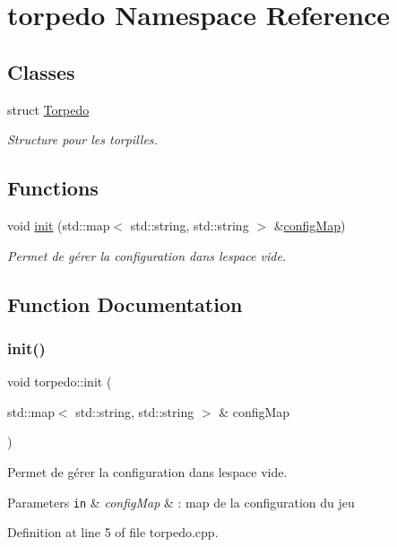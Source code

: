 \hypertarget{namespacetorpedo}{}\section{torpedo Namespace Reference}
\label{namespacetorpedo}
\subsection*{Classes}
\begin{DoxyCompactItemize}
\item 
struct \hyperlink{structtorpedo_1_1_torpedo}{Torpedo}
\begin{DoxyCompactList}\small\item\em Structure pour les torpilles. \end{DoxyCompactList}\end{DoxyCompactItemize}
\subsection*{Functions}
\begin{DoxyCompactItemize}
\item 
void \hyperlink{namespacetorpedo_ad2f33d6b4c7571ef3013ab1b7db70a8b}{init} (std\+::map$<$ std\+::string, std\+::string $>$ \&\hyperlink{main_8cpp_ada2160bcc2082e595d02f0eb5a318dd5}{config\+Map})
\begin{DoxyCompactList}\small\item\em Permet de gérer la configuration dans l\textquotesingle{}espace vide. \end{DoxyCompactList}\end{DoxyCompactItemize}


\subsection{Function Documentation}
\mbox{\label{namespacetorpedo_ad2f33d6b4c7571ef3013ab1b7db70a8b}} 
\subsubsection{\texorpdfstring{init()}{init()}}
{\footnotesize\ttfamily void torpedo\+::init (\begin{DoxyParamCaption}\item[{std\+::map$<$ std\+::string, std\+::string $>$ \&}]{config\+Map }\end{DoxyParamCaption})}



Permet de gérer la configuration dans l\textquotesingle{}espace vide. 


\begin{DoxyParams}[1]{Parameters}
\mbox{\tt in}  & {\em config\+Map} & \+: map de la configuration du jeu \\
\hline
\end{DoxyParams}


Definition at line 5 of file torpedo.\+cpp.

